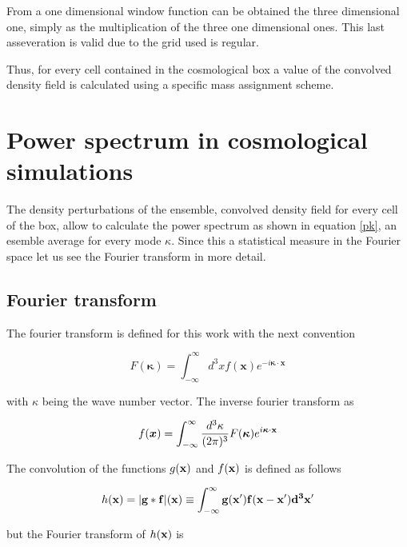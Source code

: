 From a one dimensional window function can be obtained the three dimensional one, simply as
the multiplication of the three one dimensional ones. This last asseveration is valid due to 
the grid used is regular. 

Thus, for every cell contained in the cosmological box a value of the convolved density 
field is calculated using a specific mass assignment scheme. 

\section{ Power spectrum in cosmological simulations }


The density perturbations of the ensemble, convolved density field for every cell 
of the box, allow to calculate the power spectrum as shown in equation \ref{pk},
an esemble average for every mode $\kappa$. Since this a statistical measure in
the Fourier space let us see the Fourier transform in more detail.

\subsection{Fourier transform}

The fourier transform is defined for this work with the next convention

\begin{equation}
F(\boldsymbol{\kappa}) = \int_{-\infty}^{\infty} d^3 x f(\textbf{x})e^{-i \boldsymbol{\kappa}\cdot\boldsymbol{x}	}
\label{FT}
\end{equation}

with $\kappa$ being the wave number vector. The inverse fourier transform as

\begin{equation}
f( \boldsymbol{x}) = \int_{-\infty}^{\infty} \frac{d^3 \kappa}{(2\pi)^3}  F(\boldsymbol{\kappa})e^{i \boldsymbol{\kappa}\cdot\bf{x}	}
\label{IFT}
\end{equation}

The convolution of the functions $g(\bf{x})$ and $f(\bf{x})$ is defined as follows

\[h(\bf{x}) = |g*f|(\bf{x})\equiv \int_{-\infty}^{\infty} g(\bf{x}')f(\bf{x} - \bf{x}') d^3 x' \]

but the Fourier transform of $h(\bf{x})$ is 


